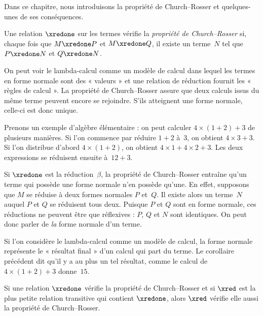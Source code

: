 \documentclass[../../../include/open-logic-section]{subfiles}
\begin{document}

Dans ce chapitre, nous introduisons la
propriété de Church--Rosser et quelques-unes
de ses conséquences.

\begin{defn}
Une relation $\xredone$ sur les termes
vérifie la \emph{propriété de Church--Rosser}
si, chaque fois que $M \xredone P$ et
$M \xredone Q$, il existe un terme~$N$ tel
que $P \xredone N$ et $Q \xredone N$.
\end{defn}

On peut voir le lambda-calcul comme un modèle
de calcul dans lequel les termes en forme
normale sont des « valeurs » et une relation
de réduction fournit les « règles de calcul ».
La propriété de Church--Rosser assure que
deux calculs issus du même terme peuvent
encore se rejoindre. S'ils atteignent une
forme normale, celle-ci est donc unique.

Prenons un exemple d'algèbre élémentaire :
on peut calculer $4 \times (1+2) + 3$ de
plusieurs manières. Si l'on commence par
réduire $1+2$ à~$3$, on obtient
$4 \times 3+3$. Si l'on distribue d'abord
$4 \times (1+2)$, on obtient
$4 \times 1+4 \times 2+3$. Les deux
expressions se réduisent ensuite à~$12+3$.

Si $\xredone$ est la réduction~$\beta$,
la propriété de Church--Rosser entraîne
qu'un terme qui possède une forme normale
n'en possède qu'une. En effet, supposons
que $M$ se réduise à deux formes normales
$P$ et~$Q$. Il existe alors un terme~$N$
auquel $P$ et $Q$ se réduisent tous deux.
Puisque $P$ et $Q$ sont en forme normale,
ces réductions ne peuvent être que réflexives :
$P$, $Q$ et $N$ sont identiques. On peut
donc parler de \emph{la} forme normale d'un terme.

Si l'on considère le lambda-calcul comme un
modèle de calcul, la forme normale représente
le « résultat final » d'un calcul qui part
du terme. Le corollaire précédent dit qu'il
y a au plus un tel résultat, comme le calcul
de $4 \times (1+2)+3$ donne~$15$.

\begin{thm}
Si une relation $\xredone$ vérifie la
propriété de Church--Rosser et si $\xred$
est la plus petite relation transitive qui
contient $\xredone$, alors $\xred$ vérifie
elle aussi la propriété de Church--Rosser.
\end{thm}
\end{document}
